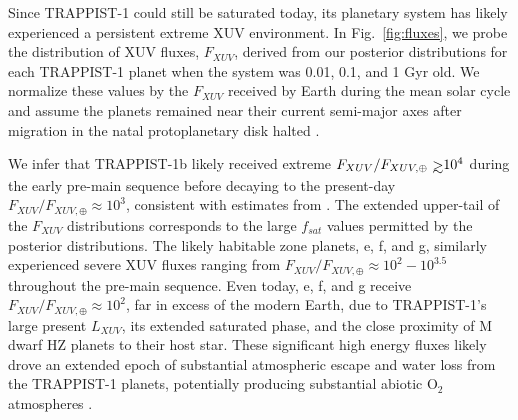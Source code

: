 \documentclass[twocolumn]{aastex62}
\def\gsim{~\rlap{$>$}{\lower 1.0ex\hbox{$\sim$}}}
\begin{document}
Since TRAPPIST-1 could still be saturated today, its planetary system has likely experienced a persistent extreme XUV environment. In Fig.~\ref{fig:fluxes}, we probe the distribution of XUV fluxes, $F_{XUV}$, derived from our posterior distributions for each TRAPPIST-1 planet when the system was 0.01, 0.1, and 1 Gyr old. We normalize these values by the $F_{XUV}$ received by Earth during the mean solar cycle \citep[$F_{XUV,\oplus} = 3.88$ erg s$^{-1}$cm$^{-2}$,][]{Ribas2005} and assume the planets remained near their current semi-major axes after migration in the natal protoplanetary disk halted \citep{Luger2017}. 

We infer that TRAPPIST-1b likely received extreme $F_{XUV}/F_{XUV, \oplus} \gsim 10^4$ during the early pre-main sequence before decaying to the present-day $F_{XUV}/F_{XUV, \oplus} \approx 10^3$, consistent with estimates from \citet{Wheatley2017}. The extended upper-tail of the $F_{XUV}$ distributions corresponds to the large $f_{sat}$ values permitted by the posterior distributions. The likely habitable zone planets, e, f, and g, similarly experienced severe XUV fluxes ranging from $F_{XUV}/F_{XUV, \oplus} \approx 10^2 - 10^{3.5}$ throughout the pre-main sequence. Even today, e, f, and g receive $F_{XUV}/F_{XUV, \oplus} \approx 10^2$, far in excess of the modern Earth, due to TRAPPIST-1's large present $L_{XUV}$, its extended saturated phase, and the close proximity of M dwarf HZ planets to their host star. These significant high energy fluxes likely drove an extended epoch of substantial atmospheric escape and water loss from the TRAPPIST-1 planets, potentially producing substantial abiotic O$_2$ atmospheres \citep{Luger2015,Bolmont2017,Bourrier2017a}.
\end{document}
